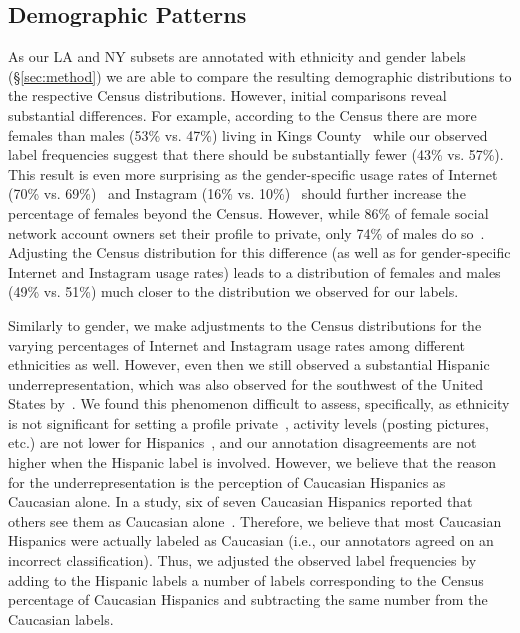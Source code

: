 \subsection{Demographic Patterns}
\label{sec:demographic-patterns}

As our LA and NY subsets are annotated with ethnicity and gender labels (\S\ref{sec:method}) we are able to compare the resulting demographic distributions to the respective Census distributions. However, initial comparisons reveal substantial differences. For example, according to the Census there are more females than males (53\% vs. 47\%) living in Kings County~\cite{census:2010} while our observed label frequencies suggest that there should be substantially fewer (43\% vs. 57\%). This result is even more surprising as the gender-specific usage rates of Internet (70\% vs. 69\%)~\cite{file:2013} and Instagram (16\% vs. 10\%)~\cite{Pew2012} should further increase the percentage of females beyond the Census. However, while 86\% of female social network account owners set their profile to private, only 74\% of males do so~\cite{PewSocialMedia2012}. Adjusting the Census distribution for this difference (as well as for gender-specific Internet and Instagram usage rates) leads to a distribution of females and males (49\% vs. 51\%) much closer to the distribution we observed for our labels.

Similarly to gender, we make adjustments to the Census distributions for the varying percentages of Internet and Instagram usage rates among different ethnicities as well. However, even then we still observed a substantial Hispanic underrepresentation, which was also observed for the southwest of the United States by~\cite{mislove-2011-twitter}. We found this phenomenon difficult to assess, specifically, as ethnicity is not significant for setting a profile private~\cite{journals/jcmc/LewisKC08}, activity levels (posting pictures, etc.) are not lower for Hispanics~\cite{statista}, and our annotation disagreements are not higher when the Hispanic label is involved. However, we believe that the reason for the underrepresentation is the perception of Caucasian Hispanics as Caucasian alone. In a study, six of seven Caucasian Hispanics reported that others see them as Caucasian alone~\cite{MelaninMillennium}. Therefore, we believe that most Caucasian Hispanics were actually labeled as Caucasian (i.e., our annotators agreed on an incorrect classification). Thus, we adjusted the observed label frequencies by adding to the Hispanic labels a number of labels corresponding to the Census percentage of Caucasian Hispanics and subtracting the same number from the Caucasian labels.

